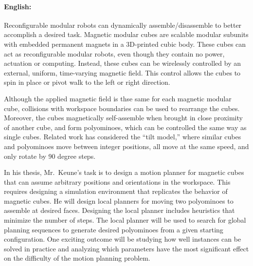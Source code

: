 \documentclass[11pt,a4paper,twoside,titlepage]{scrbook}
\theoremstyle{definition}
\begin{document}
\newpage

\paragraph{English:}
Reconfigurable modular robots can dynamically assemble/disassemble to better accomplish a desired task.
Magnetic modular cubes are scalable modular subunits with embedded permanent magnets in a 3D-printed cubic body.
These cubes can act as reconfigurable modular robots, even though they contain no power, actuation or computing.
Instead, these cubes can be wirelessly controlled by an external, uniform, time-varying magnetic field.
This control allows the cubes to spin in place or pivot walk to the left or right direction.
 
Although the applied magnetic field is thse same for each magnetic modular cube, collisions with workspace boundaries can be used to rearrange the cubes.
Moreover, the cubes magnetically self-assemble when brought in close proximity of another cube, and form polyominoes, which can be controlled the same way as single cubes.  
Related work has considered the ``tilt model,'' where similar cubes and polyominoes move between integer positions, all move at the same speed, and only rotate by 90 degree steps.

In his thesis, Mr.\ Keune's task is to design a motion planner for magnetic cubes that can assume arbitrary positions and orientations in the workspace.
This requires designing a simulation environment that replicates the behavior of magnetic cubes.
He will design local planners for moving two polyominoes to assemble at desired faces.
Designing the local planner includes heuristics that minimize the number of steps.
The local planner will be used to search for global planning sequences to generate desired polyominoes from a given starting configuration.
One exciting outcome will be studying how well instances can be solved in practice and analyzing which parameters have the most significant effect on the difficulty of the motion planning problem. 
	
	
	
	\tableofcontents
	
	\listoffigures
	
	
	
	\mainmatter
	
	
	
	
	
	
	
	
	
	
	
\end{document}
